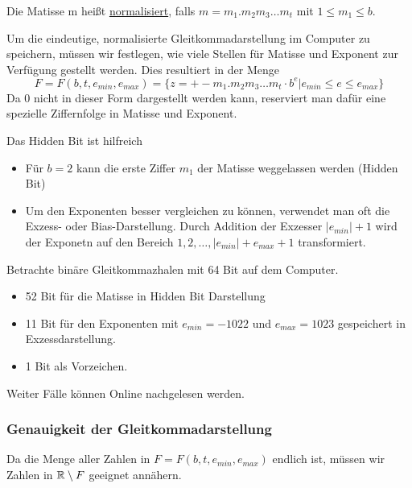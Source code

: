 \begin{definition}
Die Matisse m heißt \underline{normalisiert}, falls $m=m_1.m_2m_3 \ldots m_t$ mit $1\le m_1 \le b$.
\end{definition}
Um die eindeutige, normalisierte Gleitkommadarstellung im Computer zu speichern, müssen wir festlegen, wie viele Stellen für Matisse und Exponent zur Verfügung gestellt werden. Dies resultiert in der Menge 
\[
F=F(b,t,e_{min}, e_{max}) = \{z= +-m_1.m_2m_3\ldots m_t \cdot b^{e} | e_{min} \le e \le e_{max} \} 
\]
Da 0 nicht in dieser Form dargestellt werden kann, reserviert man dafür eine spezielle Ziffernfolge in Matisse und Exponent.
\begin{remark}
Das Hidden Bit ist hilfreich
\begin{itemize}
	\item Für $b=2$ kann die erste Ziffer $m_1$ der Matisse weggelassen werden (Hidden Bit)
	\item Um den Exponenten besser vergleichen zu können, verwendet man oft die Exzess- oder Bias-Darstellung. Durch Addition der Exzesser $|e_{min}|+1$ wird der Exponetn auf den Bereich $1,2,\ldots, |e_{min}|+e_{max} +1 $ transformiert.
\end{itemize}
\end{remark}
\begin{example}
	Betrachte binäre Gleitkommazhalen mit 64 Bit auf dem Computer. 
	\begin{itemize}
		\item 52 Bit für die Matisse in Hidden Bit Darstellung
		\item 11 Bit für den Exponenten mit $e_{min} = -1022$ und $e_{max} =1023$ gespeichert in Exzessdarstellung.
		\item 1 Bit als Vorzeichen.
	\end{itemize}
Weiter Fälle können Online nachgelesen werden.
\end{example}

\subsubsection{Genauigkeit der Gleitkommadarstellung}
Da die Menge aller Zahlen in $F=F(b,t,e_{min},e_{max})$ endlich ist, müssen wir Zahlen in $\mathbb{R} \setminus  F$ geeignet annähern.

